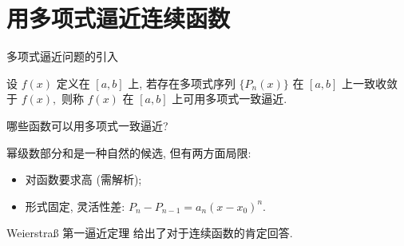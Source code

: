 
\section{用多项式逼近连续函数}


\begin{frame}{多项式逼近问题的引入}

\begin{Def}[多项式一致逼近]
设 $f(x)$ 定义在 $[a, b]$ 上, 若存在多项式序列 $\{P_n(x)\}$ 在 $[a, b]$ 上一致收敛于 $f(x),$ 则称 $f(x)$ 在 $[a, b]$ 上可用多项式一致逼近.
\end{Def}

\pause

\begin{question}
哪些函数可以用多项式一致逼近?
\end{question}

\pause

幂级数部分和是一种自然的候选, 但有两方面局限:
\begin{itemize}
\item 对函数要求高 (需解析);
\pause
\item 形式固定, 灵活性差: $P_n - P_{n-1} = a_n (x-x_0)^n.$
\end{itemize}

\pause
\vspace{0.5em}

{\color{red}Weierstraß 第一逼近定理} 给出了对于连续函数的肯定回答.

\end{frame}


